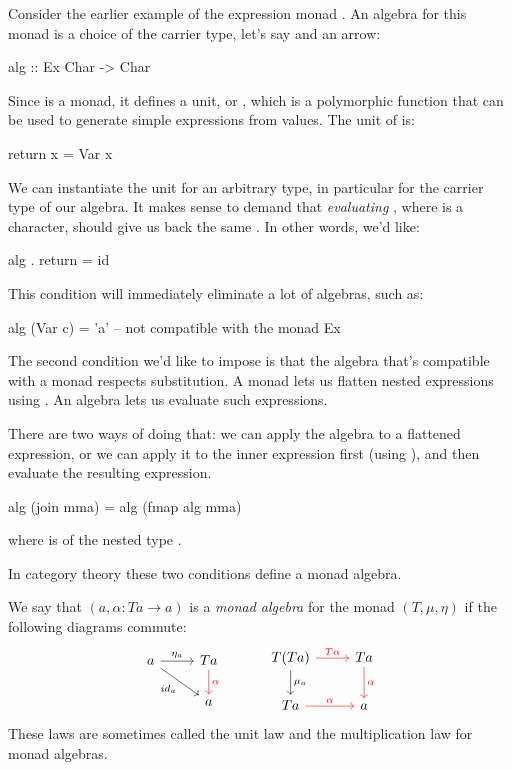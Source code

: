 \documentclass[DaoFP]{subfiles}
\begin{document}
Consider the earlier example of the expression monad . An algebra for this monad is a choice of the carrier type, let's say  and an arrow:
\begin{haskell}
alg :: Ex Char -> Char
\end{haskell}
Since  is a monad, it defines a unit, or , which is a polymorphic function that can be used to generate simple expressions from values. The unit of  is:
\begin{haskell}
return x = Var x
\end{haskell}
We can instantiate the unit for an arbitrary type, in particular for the carrier type of our algebra. It makes sense to demand that \emph{evaluating} , where  is a character, should give us back the same . In other words, we'd like:
\begin{haskell}
 alg . return = id
\end{haskell}
This condition will immediately eliminate a lot of algebras, such as:
\begin{haskell}
alg (Var c) = 'a' -- not compatible with the monad Ex
\end{haskell}

The second condition we'd like to impose is that the algebra that's compatible with a monad respects substitution. A monad lets us flatten nested expressions using . An algebra lets us evaluate such expressions. 

There are two ways of doing that: we can apply the algebra to a flattened expression, or we can apply it to the inner expression first (using ), and then evaluate the resulting expression. 
\begin{haskell}
 alg (join mma) = alg (fmap alg mma)
\end{haskell}
where  is of the nested type .

In category theory these two conditions define a monad algebra. 

We say that $(a, \alpha \colon T a \to a)$ is a \emph{monad algebra} for the monad $(T, \mu, \eta)$ if the following diagrams commute:
\[
 \begin{tikzcd}
 a
 \arrow[r, "\eta_a"]
 \arrow[dr, "id_a"']
 & T a
 \arrow[d, red, "\alpha"]
 \\
 & a
 \end{tikzcd}
  \hspace{30pt}
 \begin{tikzcd}
T(T a) 
\arrow[r, red, "T \alpha "]
\arrow[d, "\mu_a"]
&T a
\arrow[d, red, "\alpha"]
\\
T a
\arrow[r, red, "\alpha"]
& a
 \end{tikzcd}
\]
These laws are sometimes called the unit law and the multiplication law for monad algebras.
\end{document}
